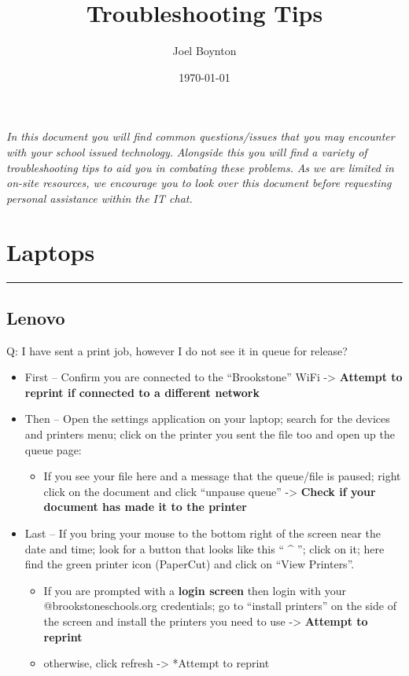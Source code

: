 \documentclass[11pt]{article}
\author{Joel Boynton}
\date{\today}
\title{Troubleshooting Tips}
\begin{document}
\maketitle
\begin{center}
\emph{In this document you will find common questions/issues that you may encounter with your school issued technology.}
\emph{Alongside this you will find a variety of troubleshooting tips to aid you in combating these problems.}
\emph{As we are limited in on-site resources, we encourage you to look over this document before requesting personal assistance within the IT chat.}
\end{center}

\clearpage \tableofcontents \clearpage
\section{Laptops}
\label{sec:org4af8026}
\noindent\rule{\textwidth}{0.5pt}
\subsection{Lenovo}
\label{sec:orgd063bbd}
Q: I have sent a print job, however I do not see it in queue for release?
\begin{itemize}
\item First -- Confirm you are connected to the ``Brookstone'' WiFi -> \textbf{Attempt to reprint if connected to a different network}
\item Then -- Open the settings application on your laptop; search for the devices and printers menu; click on the printer you sent the file too and open up the queue page:
\begin{itemize}
\item If you see your file here and a message that the queue/file is paused; right click on the document and click ``unpause queue'' -> \textbf{Check if your document has made it to the printer}
\end{itemize}

\item Last -- If you bring your mouse to the bottom right of the screen near the date and time; look for a button that looks like this `` \^{} ''; click on it; here find the green printer icon (PaperCut) and click on ``View Printers''.
\begin{itemize}
\item If you are prompted with a \textbf{login screen} then login with your @brookstoneschools.org credentials; go to ``install printers'' on the side of the screen and install the printers you need to use -> \textbf{Attempt to reprint}
\item otherwise, click refresh -> *Attempt to reprint
\end{itemize}
\end{itemize}
\end{document}
